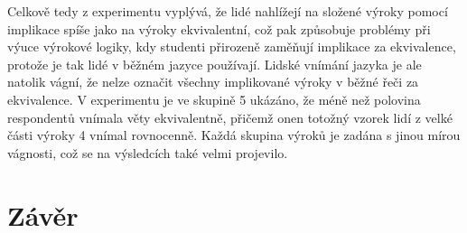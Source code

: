 Celkově tedy z experimentu vyplývá, že lidé nahlížejí na složené výroky pomocí implikace spíše jako na výroky ekvivalentní, což pak zp\r usobuje problémy při výuce výrokové logiky, kdy studenti přirozeně zamě\v nují implikace za ekvivalence, protože je tak lidé v běžném jazyce používají. Lidské vnímání jazyka je ale natolik vágní, že nelze označit všechny implikované výroky v běžné řeči za ekvivalence. V experimentu je ve skupině 5 ukázáno, že méně než polovina respondent\r u vnímala věty ekvivalentně, přičemž onen totožný vzorek lidí z velké části výroky 4 vnímal rovnocenně. Každá skupina výrok\r u je zadána s jinou mírou vágnosti, což se na výsledcích také velmi projevilo.

\chapter{Závěr}